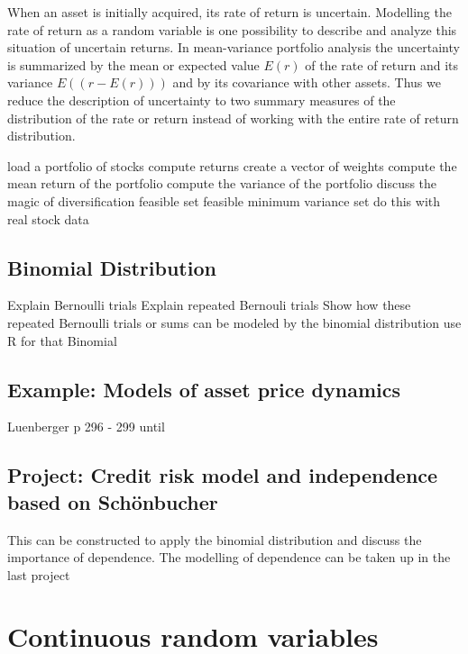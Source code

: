 \documentclass[
]{book}
\begin{document}
When an asset is initially acquired, its rate of return is uncertain. Modelling the rate of
return as a random variable is one possibility to describe and analyze this situation of
uncertain returns. In mean-variance portfolio analysis the uncertainty is summarized by
the mean or expected value \(E(r)\) of the rate of return and its variance \(E((r-E(r)))\) and by
its covariance with other assets. Thus we reduce the description of uncertainty to two
summary measures of the distribution of the rate or return instead of working with the
entire rate of return distribution.

load a portfolio of stocks
compute returns
create a vector of weights
compute the mean return of the portfolio
compute the variance of the portfolio
discuss the magic of diversification
feasible set
feasible minimum variance set
do this with real stock data

\hypertarget{binomial-distribution}{%
\section{Binomial Distribution}\label{binomial-distribution}}

Explain Bernoulli trials
Explain repeated Bernouli trials
Show how these repeated Bernoulli trials or sums can be modeled by the binomial distribution
use R for that
Binomial

\hypertarget{example-models-of-asset-price-dynamics}{%
\section{Example: Models of asset price dynamics}\label{example-models-of-asset-price-dynamics}}

Luenberger p 296 - 299 until

\hypertarget{project-credit-risk-model-and-independence-based-on-schuxf6nbucher}{%
\section{Project: Credit risk model and independence based on Schönbucher}\label{project-credit-risk-model-and-independence-based-on-schuxf6nbucher}}

This can be constructed to apply the binomial distribution and discuss the
importance of dependence. The modelling of dependence can be taken up in
the last project

\hypertarget{continuous-random-variables}{%
\chapter{Continuous random variables}\label{continuous-random-variables}}
\end{document}
